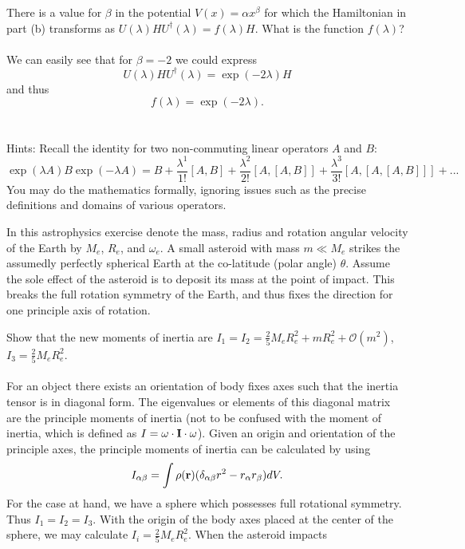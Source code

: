 \documentclass[11pt,letterpaper]{article}
\begin{document}
				
			\item
			There is a value for $\beta$ in the potential $V(x) = \alpha x^\beta$ for which the Hamiltonian in part (b) transforms as 
			$U(\lambda)HU^\dag(\lambda) = f(\lambda)H$. What is the function $f(\lambda)$?
			\\
			\\
			We can easily see that for $\beta = -2$ we could express
			\[
				U(\lambda)HU^\dag(\lambda) = \exp(-2\lambda)H
			\]
			and thus
			\[
				f(\lambda) = \exp(-2\lambda).
			\]
			\\
			\\
			Hints: Recall the identity for two non-commuting linear operators $A$ and $B$:
			\[
				\exp(\lambda A)B\exp(-\lambda A) = B+\frac{\lambda^1}{1!}[A,B]+\frac{\lambda^2}{2!}[A,[A,B]]+\frac{\lambda^3}{3!}
				[A,[A,[A,B]]]+...
			\]
			You may do the mathematics formally, ignoring issues such as the precise definitions and domains of various operators.
		\eenum
		\item
		In this astrophysics exercise denote the mass, radius and rotation angular velocity of the Earth by $M_e$, $R_e$, and 
		$\omega_e$. A small asteroid with mass $m\ll M_e$ strikes the assumedly perfectly spherical Earth at the co-latitude (polar angle) 
		$\theta$. Assume the sole effect of the asteroid is to deposit its mass at the point of impact. This breaks the full rotation symmetry of
		the Earth, and thus fixes the direction for one principle axis of rotation.
		\benum
			\item
			Show that the new moments of inertia are $I_1 = I_2 = \frac{2}{5}M_eR_e^2+mR_e^2+\mathcal O(m^2)$, 
			$I_3 = \frac{2}{5}M_eR_e^2$.
			\\ \\
			For an object there exists an orientation of body fixes axes such that the inertia tensor is in diagonal form. The eigenvalues or
			elements of this diagonal matrix are the principle moments of inertia (not to be confused with the moment of inertia, which is 
			defined as $I = \mathbf{\omega}\cdot \mathbf{I}\cdot \omega$). Given an origin and orientation of the principle axes, the principle 
			moments of inertia can be calculated by using
			\[
				I_{\alpha\beta} = \int \rho(\mathbf{r})(\delta_{\alpha\beta}r^2-r_\alpha r_\beta)dV.
			\]
			For the case at hand, we have a sphere which possesses full rotational symmetry. Thus $I_1 = I_2 = I_3$. With the origin of 
			the body axes placed at the center of the sphere, we may calculate $I_i = \frac{2}{5}M_e R_e^2$. When the asteroid impacts 
\end{document}
